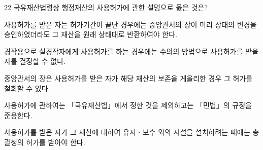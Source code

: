 \begin{question}{22}
국유재산법령상 행정재산의 사용허가에 관한 설명으로 옳은 것은?
\begin{choices}
  \item 사용허가를 받은 자는 허가기간이 끝난 경우에는 중앙관서의 장이 미리 상태의 변경을 승인하였더라도 그 재산을 원래 상태대로 반환하여야 한다.
  \item 경작용으로 실경작자에게 사용허가를 하는 경우에는 수의의 방법으로 사용허가를 받을 자를 결정할 수 없다.
  \item 중앙관서의 장은 사용허가를 받은 자가 해당 재산의 보존을 게을리한 경우 그 허가를 철회할 수 있다.
  \item 사용허가에 관하여는 「국유재산법」에서 정한 것을 제외하고는 「민법」의 규정을 준용한다.
  \item 사용허가를 받은 자가 그 재산에 대하여 유지ㆍ보수 외의 시설을 설치하려는 때에는 총괄청의 허가를 받아야 한다.
\end{choices}
\end{question}
